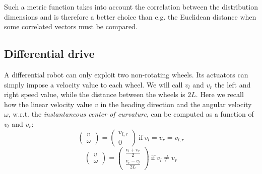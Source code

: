 		Such a metric function takes into account the correlation between the distribution dimensions and is therefore a better choice than e.g. the Euclidean distance when some correlated vectors must be compared.
	
	\subsection{Differential drive}
		\label{app.differential_drive}
		
		A differential robot can only exploit two non-rotating wheels. 
		Its actuators can simply impose a velocity value to each wheel. 
		We will call $v_l$ and $v_r$ the left and right speed value, while the distance between the wheels is $2L$.
		Here we recall how the linear velocity value $v$ in the heading direction and the angular velocity $\omega$, w.r.t. the \emph{instantaneous center of curvature}, can be computed as a function of $v_l$ and $v_r$:
		\begin{equation}
			\left(\begin{array}{c}
				v \\ \omega
			\end{array}\right)
			=
			\left(\begin{array}{c}
				v_{l,r} \\ 0
			\end{array}\right)
			\ \mathrm{if} \ v_l = v_r = v_{l,r}
		\end{equation}
		\begin{equation}
			\left(\begin{array}{c}
				v \\ \omega
			\end{array}\right)
			=
			\left(\begin{array}{c}
				\frac{v_l + v_r}{2} \\ 
				\frac{v_r - v_l}{2L}
			\end{array}\right)
			\ \mathrm{if} \ v_l \neq v_r
		\end{equation}